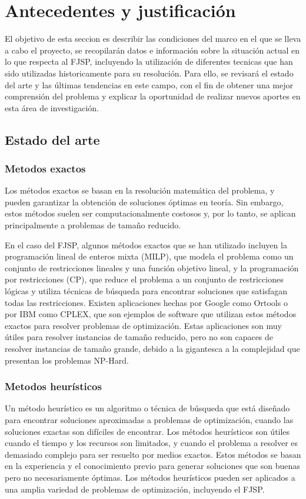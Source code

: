 \section{Antecedentes y justificación}
El objetivo de esta seccion es describir las condiciones del marco en el que se lleva a cabo 
el proyecto, se recopilarán datos e información sobre la situación actual en lo que respecta al FJSP, 
incluyendo la utilización de diferentes tecnicas que han sido utilizadas historicamente para su resolución. 
Para ello, se revisará el estado del arte y las últimas tendencias en este campo, con el fin de obtener una 
mejor comprensión del problema y explicar la oportunidad de realizar nuevos aportes en esta área de investigación.


\subsection{Estado del arte}
\subsubsection{Metodos exactos}
Los métodos exactos se basan en la resolución matemática del problema, y pueden garantizar la 
obtención de soluciones óptimas en teoría. Sin embargo, estos métodos suelen ser computacionalmente 
costosos y, por lo tanto, se aplican principalmente a problemas de tamaño reducido.\medskip

En el caso del FJSP, algunos métodos exactos que se han utilizado incluyen la programación 
lineal de enteros mixta (MILP)\cite{milp}, que modela el problema como un conjunto de restricciones lineales y 
una función objetivo lineal, y la programación por restricciones (CP)\cite{wikiCP}, que reduce el problema a
un conjunto de restricciones lógicas y utiliza técnicas de búsqueda para encontrar soluciones que satisfagan 
todas las restricciones. Existen aplicaciones hechas por Google como Ortools\cite{ortools}
o por IBM como CPLEX\cite{cplex}, que son ejemplos de software que utilizan estos métodos exactos para resolver
problemas de optimización. Estas aplicaciones son muy útiles para resolver instancias de tamaño reducido,
pero no son capaces de resolver instancias de tamaño grande, debido a la gigantesca a la complejidad que 
presentan los problemas NP-Hard.


\subsubsection{Metodos heurísticos}
Un método heurístico es un algoritmo o técnica de búsqueda que está diseñado para encontrar 
soluciones aproximadas a problemas de optimización, cuando las soluciones exactas son difíciles 
de encontrar. Los métodos heurísticos son útiles cuando el tiempo y los recursos son limitados, 
y cuando el problema a resolver es demasiado complejo para ser resuelto por medios exactos. 
Estos métodos se basan en la experiencia y el conocimiento previo para generar soluciones que 
son buenas pero no necesariamente óptimas. Los métodos heurísticos pueden ser aplicados a una 
amplia variedad de problemas de optimización, incluyendo el FJSP.\medskip

